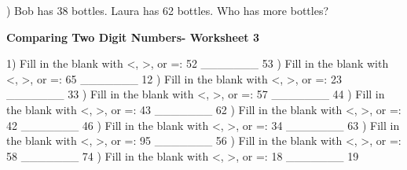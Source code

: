 \documentclass{article}%
\begin{document}
) Bob has 38 bottles. Laura has 62 bottles. Who has more bottles?%
\newline%
\newline%
\newline%
\pagebreak%
\large%
\begin{center}%
\textbf{Comparing Two Digit Numbers- Worksheet 3}%
\newline%
\end{center} \normalsize%
1) Fill in the blank with <, >, or =: 52 \_\_\_\_\_\_\_ 53%
\newline%
\newline%
) Fill in the blank with <, >, or =: 65 \_\_\_\_\_\_\_ 12%
\newline%
\newline%
) Fill in the blank with <, >, or =: 23 \_\_\_\_\_\_\_ 33%
\newline%
\newline%
) Fill in the blank with <, >, or =: 57 \_\_\_\_\_\_\_ 44%
\newline%
\newline%
) Fill in the blank with <, >, or =: 43 \_\_\_\_\_\_\_ 62%
\newline%
\newline%
) Fill in the blank with <, >, or =: 42 \_\_\_\_\_\_\_ 46%
\newline%
\newline%
) Fill in the blank with <, >, or =: 34 \_\_\_\_\_\_\_ 63%
\newline%
\newline%
) Fill in the blank with <, >, or =: 95 \_\_\_\_\_\_\_ 56%
\newline%
\newline%
) Fill in the blank with <, >, or =: 58 \_\_\_\_\_\_\_ 74%
\newline%
\newline%
) Fill in the blank with <, >, or =: 18 \_\_\_\_\_\_\_ 19%
\newline%
\newline%
\newline%
\end{document}

